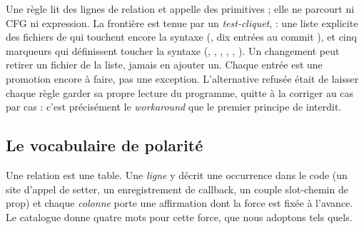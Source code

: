 \begin{decision}
Une règle lit des lignes de relation et appelle des primitives  ; elle ne parcourt ni CFG ni expression. La frontière est tenue par un \emph{test-cliquet},  : une liste explicite des fichiers de  qui touchent encore la syntaxe (, dix entrées au commit \snapshotCommit), et cinq marqueurs qui définissent \og toucher la syntaxe\fg{} (, , , , , ). Un changement peut retirer un fichier de la liste, jamais en ajouter un. Chaque entrée est \og une promotion encore à faire, pas une exception\fg{}. L'alternative refusée était de laisser chaque règle garder sa propre lecture du programme, quitte à la corriger au cas par cas : c'est précisément le \emph{workaround} que le premier principe de  interdit.
\end{decision}

\subsection{Le vocabulaire de polarité}

Une relation est une table. Une \emph{ligne} y décrit une occurrence dans le code (un site d'appel de setter, un enregistrement de callback, un couple slot-chemin de prop) et chaque \emph{colonne} porte une affirmation dont la force est fixée à l'avance. Le catalogue donne quatre mots pour cette force, que nous adoptons tels quels.

